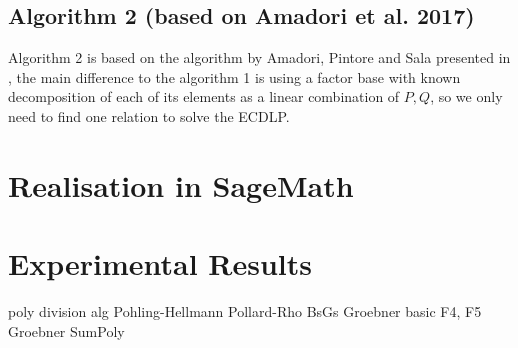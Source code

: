 \documentclass[thesis=M,english]{FITthesis}[2012/10/20]
\theoremstyle{remark}
\theoremstyle{definition}
\newtheorem{DF}{Definition}[section]
\begin{document}
\section{Algorithm 2 (based on Amadori et al. 2017)}
Algorithm 2 is based on the algorithm by Amadori, Pintore and Sala presented in \cite{amadori17}, the main difference to the algorithm 1 is using a factor base with known decomposition of each of its elements as a linear combination of $P,Q$, so we only need to find one relation to solve the ECDLP. 






\chapter{Realisation in SageMath}

\chapter{Experimental Results}
\label{expResults}
poly division alg
Pohling-Hellmann
Pollard-Rho
BsGs
Groebner basic
F4, F5 Groebner
SumPoly 
\end{document}
